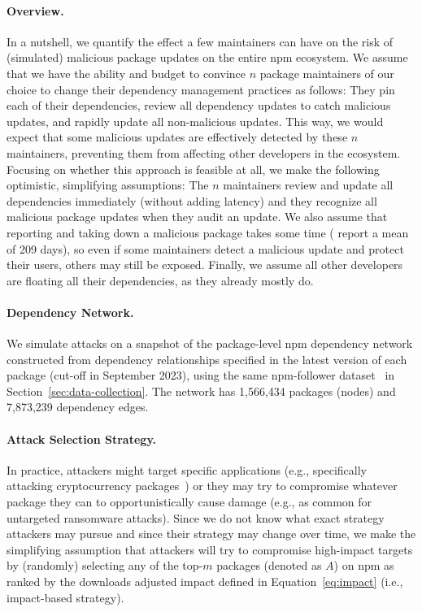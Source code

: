 \paragraph{Overview.}
In a nutshell, we quantify the effect a few maintainers can have on %
the risk of (simulated) malicious package updates on the entire npm ecosystem.
We assume that we have the ability and budget to convince $n$ package maintainers of our choice to change their dependency management practices as follows: They pin each of their dependencies, review all dependency updates to catch malicious updates, and rapidly update all non-malicious updates.
This way, we would expect that some malicious updates are effectively detected by these $n$ maintainers, preventing them from affecting other developers in the ecosystem.
{Focusing on whether this approach is feasible at all, we make the following optimistic, simplifying assumptions: The $n$ maintainers review and update all dependencies immediately (without adding latency)
and they recognize all malicious package updates when they audit an update. %
We also assume that reporting and taking down a malicious package takes some time (\citet{DBLP:conf/dimva/OhmPS020} report a mean of 209 days), so even if some maintainers detect a malicious update and protect their users, others may still be exposed.
} 
Finally, we assume all other developers are floating all their dependencies, as they already mostly do. 

\paragraph{Dependency Network.}
We simulate attacks on a snapshot of the package-level npm dependency network constructed from dependency relationships specified in the latest version of each package (cut-off in September 2023), using the same npm-follower dataset~\cite{DBLP:conf/sigsoft/PinckneyCG023} in Section~\ref{sec:data-collection}. 
The network has 1,566,434 packages (nodes) and 7,873,239 dependency edges.

\paragraph{Attack Selection Strategy.}
In practice, attackers might target specific applications (e.g., specifically attacking cryptocurrency packages~\cite{crypto-attack}) or they may try to compromise whatever package they can to opportunistically cause damage (e.g., as common for untargeted ransomware attacks). Since we do not know what exact strategy attackers may pursue and since their strategy may change over time, we make the simplifying assumption that attackers will try to compromise high-impact targets by (randomly) selecting any of the top-$m$ packages (denoted as $A$) on npm as ranked by the downloads adjusted impact defined in Equation~\ref{eq:impact} (i.e., impact-based strategy).

